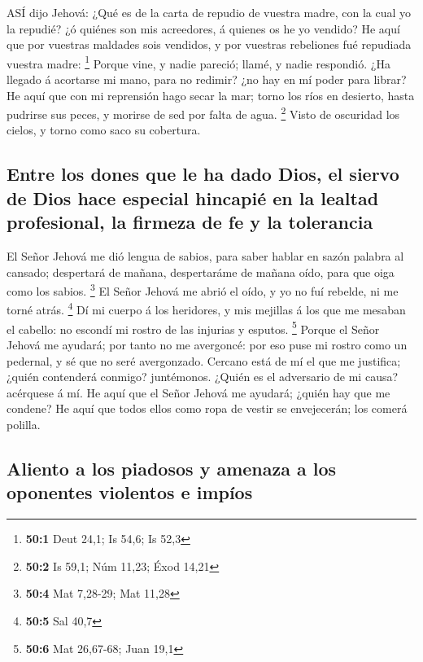  ASÍ dijo Jehová: ¿Qué es de la carta de repudio de vuestra
madre, con la cual yo la repudié? ¿ó quiénes son mis acreedores, á
quienes os he yo vendido? He aquí que por vuestras maldades sois
vendidos, y por vuestras rebeliones fué repudiada vuestra madre:
\footnote{\textbf{50:1} Deut 24,1; Is 54,6; Is 52,3}  Porque
vine, y nadie pareció; llamé, y nadie respondió. ¿Ha llegado á acortarse
mi mano, para no redimir? ¿no hay en mí poder para librar? He aquí que
con mi reprensión hago secar la mar; torno los ríos en desierto, hasta
pudrirse sus peces, y morirse de sed por falta de agua. \footnote{\textbf{50:2}
  Is 59,1; Núm 11,23; Éxod 14,21}  Visto de oscuridad los
cielos, y torno como saco su cobertura.

\hypertarget{entre-los-dones-que-le-ha-dado-dios-el-siervo-de-dios-hace-especial-hincapiuxe9-en-la-lealtad-profesional-la-firmeza-de-fe-y-la-tolerancia}{%
\subsection{Entre los dones que le ha dado Dios, el siervo de Dios hace
especial hincapié en la lealtad profesional, la firmeza de fe y la
tolerancia}\label{entre-los-dones-que-le-ha-dado-dios-el-siervo-de-dios-hace-especial-hincapiuxe9-en-la-lealtad-profesional-la-firmeza-de-fe-y-la-tolerancia}}

 El Señor Jehová me dió lengua de sabios, para saber hablar
en sazón palabra al cansado; despertará de mañana, despertaráme de
mañana oído, para que oiga como los sabios. \footnote{\textbf{50:4} Mat
  7,28-29; Mat 11,28}  El Señor Jehová me abrió el oído, y
yo no fuí rebelde, ni me torné atrás. \footnote{\textbf{50:5} Sal 40,7}
 Dí mi cuerpo á los heridores, y mis mejillas á los que me
mesaban el cabello: no escondí mi rostro de las injurias y esputos.
\footnote{\textbf{50:6} Mat 26,67-68; Juan 19,1}  Porque el
Señor Jehová me ayudará; por tanto no me avergoncé: por eso puse mi
rostro como un pedernal, y sé que no seré avergonzado. 
Cercano está de mí el que me justifica; ¿quién contenderá conmigo?
juntémonos. ¿Quién es el adversario de mi causa? acérquese á mí.
 He aquí que el Señor Jehová me ayudará; ¿quién hay que me
condene? He aquí que todos ellos como ropa de vestir se envejecerán; los
comerá polilla.

\hypertarget{aliento-a-los-piadosos-y-amenaza-a-los-oponentes-violentos-e-impuxedos}{%
\subsection{Aliento a los piadosos y amenaza a los oponentes violentos e
impíos}\label{aliento-a-los-piadosos-y-amenaza-a-los-oponentes-violentos-e-impuxedos}}

